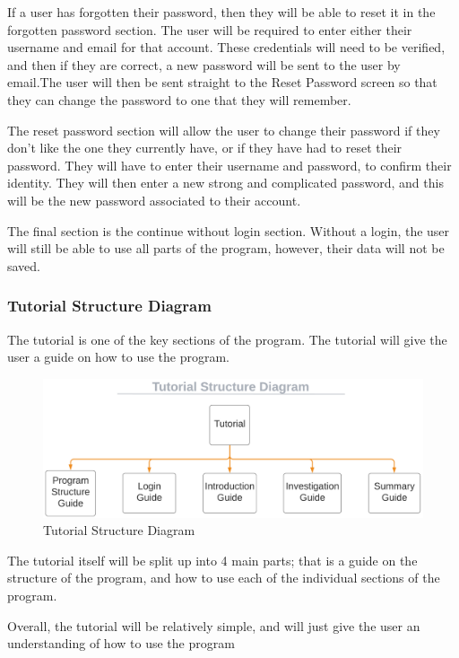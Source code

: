 \documentclass{article}
\begin{document}
If a user has forgotten their password, then they will be able to reset it in the forgotten password section. The user will be required to enter either their username and email for that account. These credentials will need to be verified, and then if they are correct, a new password will be sent to the user by email.The user will then be sent straight to the Reset Password screen so that they can change the password to one that they will remember.

The reset password section will allow the user to change their password if they don't like the one they currently have, or if they have had to reset their password. They will have to enter their username and password, to confirm their identity. They will then enter a new strong and complicated password, and this will be the new password associated to their account.

The final section is the continue without login section. Without a login, the user will still be able to use all parts of the program, however, their data will not be saved.

\subsubsection{Tutorial Structure Diagram}

The tutorial is one of the key sections of the program. The tutorial will give the user a guide on how to use the program.

\begin{figure}[h]
    \centering
    \captionsetup{justification=centering}
    \includegraphics[scale=0.55]{tutorial-structure-diagram}
    \caption{Tutorial Structure Diagram}
\end{figure}

The tutorial itself will be split up into 4 main parts; that is a guide on the structure of the program, and how to use each of the individual sections of the program.

Overall, the tutorial will be relatively simple, and will just give the user an understanding of how to use the program
\end{document}
